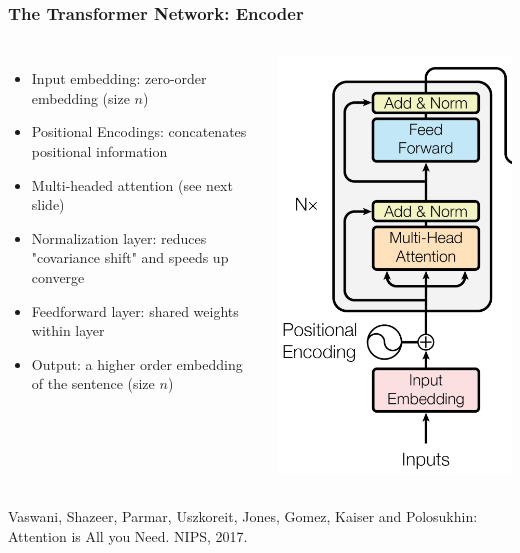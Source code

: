 \documentclass[10pt]{beamer}
\begin{document}
\begin{frame}
  \frametitle{The Transformer Network: Encoder}
  \begin{columns}
\begin{itemize}
\setlength\itemsep{.8em}
\item Input embedding: zero-order embedding (size $n$)
\item Positional Encodings: concatenates positional information
\item Multi-headed attention (see next slide)
\item Normalization layer: reduces "covariance shift" and speeds up converge
\item Feedforward layer: shared weights within layer 
\item Output: a higher order embedding of the sentence (size $n$)
\end{itemize}
\begin{center}
	\includegraphics[width=.6\columnwidth]{images/enc}
\end{center}
    \end{columns}
\vspace{.75cm}
\scriptsize{Vaswani, Shazeer, Parmar, Uszkoreit, Jones, Gomez, Kaiser and Polosukhin: Attention is All you Need. NIPS, 2017.}
\end{frame}
\end{document}
